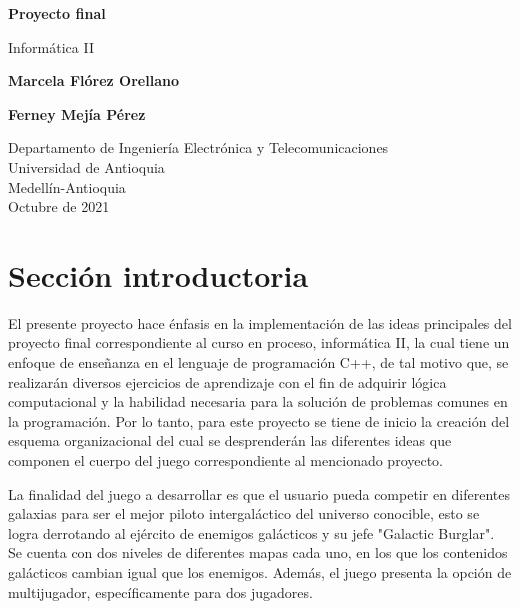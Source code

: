 \documentclass{article}
\begin{document}
\begin{titlepage}
    \begin{center}
        \vspace*{1cm}
            
        \Huge
        \textbf{Proyecto final}
            
        \vspace{0.5cm}
        \LARGE
        Informática II
            
            
        \vspace{1.5cm}
        
        \textbf{Marcela Flórez Orellano} 
        
        \vspace{0.3cm}
        \LARGE
        
        \textbf{Ferney Mejía Pérez}
            
        \vfill
            
        \vspace{0.8cm}
            
        \Large
        Departamento de Ingeniería Electrónica y Telecomunicaciones\\
        Universidad de Antioquia\\
        Medellín-Antioquia\\
        Octubre de 2021
         
            
    \end{center}
\end{titlepage}


\tableofcontents
\newpage


\section{Sección introductoria}\label{intro}
El presente proyecto hace énfasis en la implementación de las ideas principales del proyecto final correspondiente al curso en proceso, informática II, la cual tiene un enfoque de enseñanza en el lenguaje de programación C++, de tal motivo que, se realizarán diversos ejercicios de aprendizaje con el fin de adquirir lógica computacional y la habilidad necesaria para la solución de problemas comunes en la programación. Por lo tanto, para este proyecto se tiene de inicio la creación del esquema organizacional del cual se desprenderán las diferentes ideas que componen el cuerpo del juego correspondiente al mencionado proyecto.

La finalidad del juego a desarrollar es que el usuario pueda competir en diferentes galaxias para ser el mejor piloto intergaláctico del universo conocible, esto se logra derrotando al ejército de enemigos galácticos y su jefe "Galactic Burglar". Se cuenta con dos niveles de diferentes mapas cada uno, en los que los contenidos galácticos cambian igual que los enemigos. Además, el juego presenta la opción de multijugador, específicamente para dos jugadores.
\end{document}
